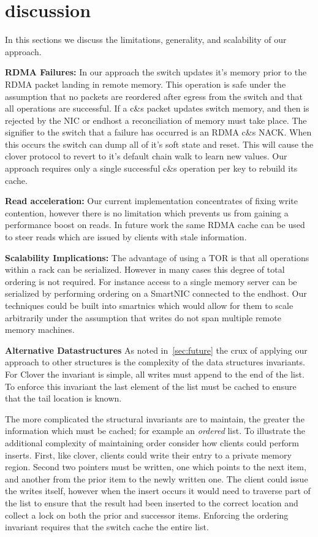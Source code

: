 \section{discussion}

In this sections we discuss the limitations, generality, and scalability of our approach.



\textbf{RDMA Failures:}
In our approach the switch updates it's memory prior to the RDMA packet
landing in remote memory. This operation is safe under the assumption that no
packets are reordered after egress from the switch and that all operations
are successful. If a c\&s packet updates switch memory, and then is rejected
by the NIC or endhost a reconciliation of memory must take place. The
signifier to the switch that a failure has occurred is an RDMA c\&s NACK. When
this occurs the switch can dump all of it's soft state and reset. This will
cause the clover protocol to revert to it's default chain walk to learn new
values. Our approach requires only a single successful c\&s operation per key
to rebuild its cache.

\textbf{Read acceleration:}
Our current implementation concentrates of fixing write contention,
however there is no limitation which prevents us from gaining a performance
boost on reads. In future work the same RDMA cache can be used to steer
reads which are issued by clients with stale information.


\textbf{Scalability Implications:}
The advantage of using a TOR is that all operations within a rack can be
serialized. However in many cases this degree of total ordering is not
required. For instance access to a single memory server can be serialized by
performing ordering on a SmartNIC connected to the endhost. Our techniques
could be built into smartnics which would allow for them to scale arbitrarily
under the assumption that writes do not span multiple remote memory machines.


\textbf{Alternative Datastructures}
As noted in~\ref{sec:future} the crux of applying our approach to other
structures is the complexity of the data structures invariants. For Clover
the invariant is simple, all writes must append to the end of the list. To
enforce this invariant the last element of the list must be cached to ensure
that the tail location is known.

The more complicated the structural invariants are to maintain, the greater
the information which must be cached; for example an \textit{ordered} list.
To illustrate the additional complexity of maintaining order consider how
clients could perform inserts. First, like clover, clients could write their
entry to a private memory region. Second two pointers must be written, one
which points to the next item, and another from the prior item to the newly
written one. The client could issue the writes itself, however when the
insert occurs it would need to traverse part of the list to ensure that the
result had been inserted to the correct location and collect a lock on both
the prior and successor items. Enforcing the ordering invariant requires that
the switch cache the entire list.

